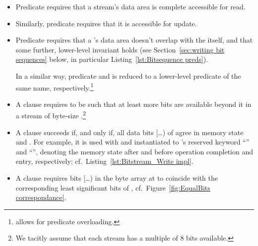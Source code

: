 \begin{itemize}
\item Predicate  requires that a stream's data area is
	complete accessible for read.
\item Similarly, predicate  requires that it is
	accessible for update.

\item Predicate  requires that a 
	's data area
	doesn't overlap with the  itself, and that some
	further, lower-level invariant holds (see 
	Section~\ref{sec:writing bit sequences} below, in particular
	Listing~\ref{lst:Bitsequence preds}).

	In a similar way, predicate  and
	 is reduced to a
	lower-level predicate of the same 
	name, 
	respectively.\footnote{\framac allows for predicate overloading.}

\item
	A clause  requires
	 to be such that at least 
	more bits are available beyond it in a stream of byte-size
	.\footnote{
		We tacitly assume that each stream has a multiple of 8 bits
		available.
	}

\item
	A clause
	 succeeds if,
	and only if, 
	all data bits [\ldots{})
	of  agree in memory state  and
	.
	For example, it is used with  and 
	instantiated to \framac's reserved keyword ``'' and
	``'', denoting the memory state after and before
	operation completion and entry, respectively; cf.\
	Listing~\ref{lst:Bitstream_Write impl}.

\item
	A clause  requires 
	bits [\ldots{}) in
	the byte array at  to coincide with the
	corresponding least significant bits of ,
	cf.~Figure~\ref{fig:EqualBits correspondance}.
\end{itemize}



